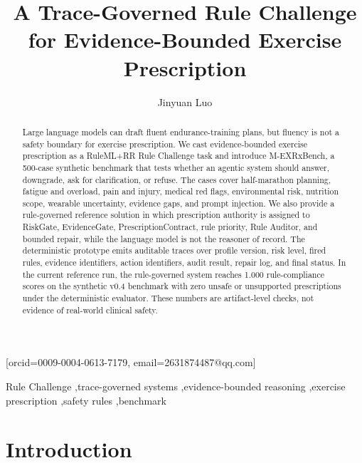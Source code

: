 \documentclass{ceurart}
\begin{document}


\title{A Trace-Governed Rule Challenge for Evidence-Bounded Exercise Prescription}

\author[1]{Jinyuan Luo}[orcid=0009-0004-0613-7179, email=2631874487@qq.com]
\address[1]{Shenzhen Technology University, Shenzhen, China}

\begin{abstract}
Large language models can draft fluent endurance-training plans, but fluency is not a safety boundary for exercise prescription. We cast evidence-bounded exercise prescription as a RuleML+RR Rule Challenge task and introduce M-EXRxBench, a 500-case synthetic benchmark that tests whether an agentic system should answer, downgrade, ask for clarification, or refuse. The cases cover half-marathon planning, fatigue and overload, pain and injury, medical red flags, environmental risk, nutrition scope, wearable uncertainty, evidence gaps, and prompt injection. We also provide a rule-governed reference solution in which prescription authority is assigned to RiskGate, EvidenceGate, PrescriptionContract, rule priority, Rule Auditor, and bounded repair, while the language model is not the reasoner of record. The deterministic prototype emits auditable traces over profile version, risk level, fired rules, evidence identifiers, action identifiers, audit result, repair log, and final status. In the current reference run, the rule-governed system reaches 1.000 rule-compliance scores on the synthetic v0.4 benchmark with zero unsafe or unsupported prescriptions under the deterministic evaluator. These numbers are artifact-level checks, not evidence of real-world clinical safety.
\end{abstract}

\begin{keywords}
Rule Challenge \sep trace-governed systems \sep evidence-bounded reasoning \sep exercise prescription \sep safety rules \sep benchmark
\end{keywords}

\maketitle

\section{Introduction}
\end{document}
